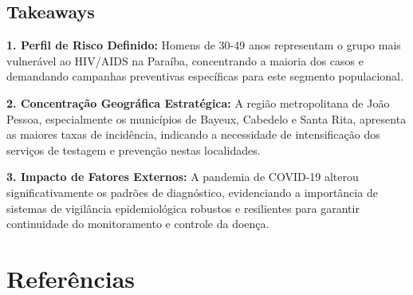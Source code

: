 \documentclass[10pt,a4paper]{article}
\begin{document}
\begin{multicols}{2}
\section{Takeaways}

\textbf{1. Perfil de Risco Definido:} Homens de 30-49 anos representam o grupo mais vulnerável ao HIV/AIDS na Paraíba, concentrando a maioria dos casos e demandando campanhas preventivas específicas para este segmento populacional.

\textbf{2. Concentração Geográfica Estratégica:} A região metropolitana de João Pessoa, especialmente os municípios de Bayeux, Cabedelo e Santa Rita, apresenta as maiores taxas de incidência, indicando a necessidade de intensificação dos serviços de testagem e prevenção nestas localidades.

\textbf{3. Impacto de Fatores Externos:} A pandemia de COVID-19 alterou significativamente os padrões de diagnóstico, evidenciando a importância de sistemas de vigilância epidemiológica robustos e resilientes para garantir continuidade do monitoramento e controle da doença.

\end{multicols}

\section{Referências}
\printbibliography[heading=none]
\end{document}
